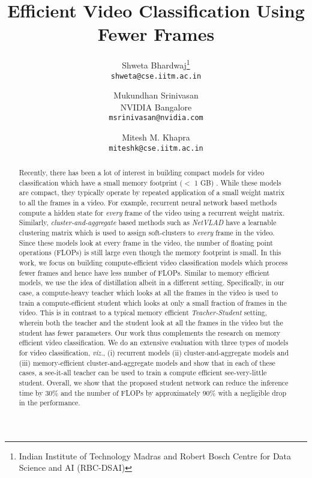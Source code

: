 \documentclass[10pt,twocolumn,letterpaper]{article}
\begin{document}
\title{Efficient Video Classification Using Fewer Frames}
\newcommand*\samethanks[1][\value{footnote}]{\footnotemark[#1]}
\author{Shweta Bhardwaj\thanks{Indian Institute of Technology Madras and Robert Bosch Centre for Data Science and AI (RBC-DSAI)}\\  {\tt\small shweta@cse.iitm.ac.in} 
        \and
        Mukundhan Srinivasan \\ \small{NVIDIA Bangalore} \\ {\tt\small msrinivasan@nvidia.com} \\
        \and
        Mitesh M. Khapra\samethanks\\  
        {\tt\small miteshk@cse.iitm.ac.in}
}





\maketitle


\begin{abstract}
Recently, there has been a lot of interest in building compact models for video classification which have a small memory footprint ($<$ 1 GB) \cite{summary-paper}. While these models are compact, they typically operate by repeated application of a small weight matrix to all the frames in a video. For example, recurrent neural network based methods compute a hidden state for \textit{every} frame of the video using a recurrent weight matrix. Similarly, \textit{cluster-and-aggregate} based methods such as \textit{NetVLAD} have a learnable clustering matrix which is used to assign soft-clusters to \textit{every} frame in the video. Since these models look at every frame in the video, the number of floating point operations (FLOPs) is still large even though the memory footprint is small. In this work, we focus on building compute-efficient video classification models which process fewer frames and hence have less number of FLOPs. Similar to memory efficient models, we use the idea of distillation albeit in a different setting. Specifically, in our case, a compute-heavy teacher which looks at all the frames in the video is used to train a compute-efficient student which looks at only a small fraction of frames in the video. This is in contrast to a typical memory efficient \textit{Teacher-Student} setting, wherein both the teacher and the student look at all the frames in the video but the student has fewer parameters. Our work thus complements the research on memory efficient video classification. We do an extensive evaluation with three types of models for video classification, \textit{viz.}, (i) recurrent models (ii) cluster-and-aggregate models and (iii) memory-efficient cluster-and-aggregate models and show that in each of these cases, a see-it-all teacher can be used to train a compute efficient see-very-little student. Overall, we show that the proposed student network can reduce the inference time by $30\%$ and the number of FLOPs by approximately $90$\% with a negligible drop in the performance. 

\end{abstract}
\end{document}
